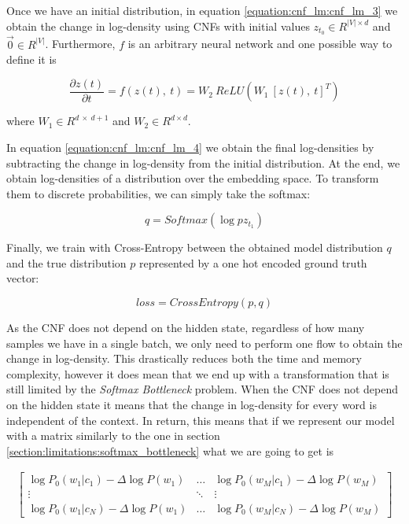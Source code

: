 Once we have an initial distribution, in equation \ref{equation:cnf_lm:cnf_lm_3} we obtain the change in log-density using CNFs with initial values $ z_{t_0} \in R^{|V| \times d}$ and $ \vec{0} \in R^{|V|} $. Furthermore, $ f $ is an arbitrary neural network and one possible way to define it is

\begin{displaymath}
    \frac{\partial z(t)}{\partial t} = f(z(t), \ t) = W_2 \ ReLU(W_1 \ [z(t), \ t]^T)
\end{displaymath}

where $ W_1 \in R^{d \ \times \ d+1} $ and $ W_2 \in R^{d \times d} $.

In equation \ref{equation:cnf_lm:cnf_lm_4} we obtain the final log-densities by subtracting the change in log-density from the initial distribution. At the end, we obtain log-densities of a distribution over the embedding space. To transform them to discrete probabilities, we can simply take the softmax:

\begin{displaymath}
    q = Softmax(\log pz_{t_1})    
\end{displaymath}

Finally, we train with Cross-Entropy between the obtained model distribution $ q $ and the true distribution $ p $ represented by a one hot encoded ground truth vector:

\begin{displaymath}
    loss = CrossEntropy(p, q)    
\end{displaymath}

As the CNF does not depend on the hidden state, regardless of how many samples we have in a single batch, we only need to perform one flow to obtain the change in log-density. This drastically reduces both the time and memory complexity, however it does mean that we end up with a transformation that is still limited by the \emph{Softmax Bottleneck} problem. When the CNF does not depend on the hidden state it means that the change in log-density for every word is independent of the context. In return, this means that if we represent our model with a matrix similarly to the one in section \ref{section:limitations:softmax_bottleneck} what we are going to get is

\begin{displaymath}
    \begin{matrix}
        \begin{bmatrix}
            \log P_0(w_1 | c_1) - \Delta \log P(w_1) & \hdots & \log P_0(w_M | c_1) - \Delta \log P(w_M)  \\
            \vdots & \ddots & \vdots \\
            \log P_0(w_1 | c_N) - \Delta \log P(w_1) & \hdots & \log P_0(w_M | c_N) - \Delta \log P(w_M)
        \end{bmatrix}
    \end{matrix}
\end{displaymath}

